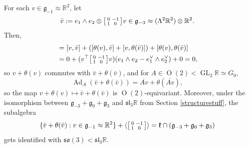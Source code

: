 \documentclass[12pt,a4paper]{amsart}
\theoremstyle{definition}
\DeclareMathOperator{\Ad}{Ad}
\DeclareMathOperator{\Orth}{O}
\DeclareMathOperator{\GLin}{GL}
\newenvironment{smallbmatrix}
  {\left[\begin{smallmatrix}}
  {\end{smallmatrix}\right]}
\newcommand{\rotoiso}{\begin{smallbmatrix}0 & -1 \\ 1 & 0\end{smallbmatrix}}
\begin{document}
For each $v\in\mathfrak{g}_{-1}\approx\mathbb{R}^2$, let
\[\bar{v}:=e_1\wedge e_2\otimes\rotoiso v\in\mathfrak{g}_{-3}\approx(\Lambda^2\mathbb{R}^2)\otimes\mathbb{R}^2.\]
Then,
\begin{align*}[v+\theta(v),\bar{v}+\theta(\bar{v})] & =[v,\bar{v}]+([\theta(v),\bar{v}]+[v,\theta(\bar{v})])+[\theta(v),\theta(\bar{v})] \\ & =0+(v^\top\rotoiso v)(e_1\wedge e_2-e_1^\vee\wedge e_2^\vee)+0=0,\end{align*}
so $v+\theta(v)$ commutes with $\bar{v}+\theta(\bar{v})$, and for $A\in\Orth(2)<\GLin_2\mathbb{R}\simeq G_0$,
\[\Ad_A(\bar{v}+\theta(\bar{v}))=\overline{Av}+\theta\!\left(\overline{Av}\right)\!,\]
so the map $v+\theta(v)\mapsto\bar{v}+\theta(\bar{v})$ is $\Orth(2)$-equivariant. Moreover, under the isomorphism between $\mathfrak{g}_{-3}+\mathfrak{g}_0+\mathfrak{g}_3$ and $\mathfrak{sl}_3\mathbb{R}$ from Section \ref{structurestuff}, the subalgebra
\[\{\bar{v}+\theta(\bar{v}):v\in\mathfrak{g}_{-1}\approx\mathbb{R}^2\}+\langle\rotoiso\rangle=\mathfrak{k}\cap(\mathfrak{g}_{-3}+\mathfrak{g}_0+\mathfrak{g}_3)\]
gets identified with $\mathfrak{so}(3)<\mathfrak{sl}_3\mathbb{R}$.
\end{document}
